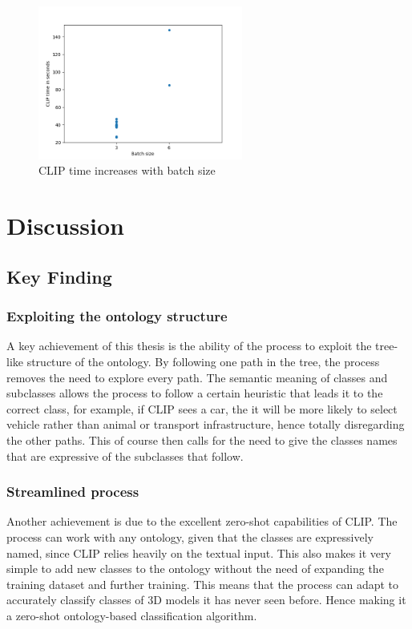 \documentclass[a4paper,11pt,oneside]{article}
\begin{document}
  \begin{figure}[H]
  	\centering
  	\includegraphics[width=0.6\textwidth]{figures/CLIP_time_batch.png}
  	\caption{CLIP time increases with batch size}
  	\label{fig:fig3}
  \end{figure} 
  
  \section{Discussion}
  \subsection{Key Finding}
  \subsubsection{Exploiting the ontology structure}
  A key achievement of this thesis is the ability of the process to exploit the tree-like structure of the ontology. By following one path in the tree, the process removes the need to explore every path. The semantic meaning of classes and subclasses allows the process to follow a certain heuristic that leads it to the correct class, for example, if CLIP sees a car, the it will be more likely to select vehicle rather than animal or transport infrastructure, hence totally disregarding the other paths. This of course then calls for the need to give the classes names that are expressive of the subclasses that follow.
  \subsubsection{Streamlined process}
  Another achievement is due to the excellent zero-shot capabilities of CLIP. The process can work with any ontology, given that the classes are expressively named, since CLIP relies heavily on the textual input. This also makes it very simple to add new classes to the ontology without the need of expanding the training dataset and further training. This means that the process can adapt to accurately classify classes of 3D models it has never seen before. Hence making it a zero-shot ontology-based classification algorithm.
\end{document}
